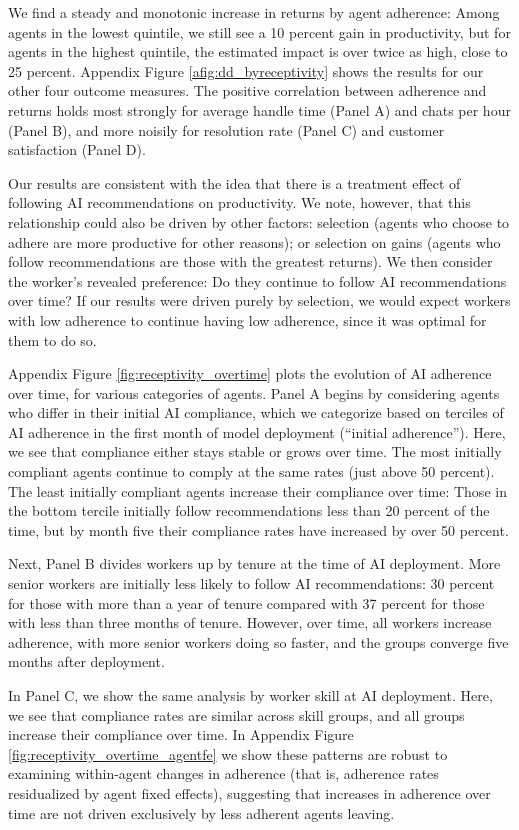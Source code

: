 \documentclass[11pt]{article}
\begin{document}
We find a steady and monotonic increase in returns by agent adherence: Among agents in the lowest quintile, we still see a 10 percent gain in productivity, but for agents in the highest quintile, the estimated impact is over twice as high, close to 25 percent.  Appendix Figure \ref{afig:dd_byreceptivity} shows the results for our other four outcome measures. The positive correlation between adherence and returns holds most strongly for average handle time (Panel A) and chats per hour (Panel B), and more noisily for resolution rate (Panel C) and customer satisfaction (Panel D). 

Our results are consistent with the idea that there is a treatment effect of following AI recommendations on productivity.  We note, however, that this relationship could also be driven by other factors: selection (agents who choose to adhere are more productive for other reasons); or selection on gains (agents who follow recommendations are those with the greatest returns).  We then consider the worker's revealed preference: Do they continue to follow AI recommendations over time?  If our results were driven purely by selection, we would expect workers with low adherence to continue having low adherence, since it was optimal for them to do so.

Appendix Figure \ref{fig:receptivity_overtime} plots the evolution of AI adherence over time, for various categories of agents.  Panel A begins by considering agents who differ in their initial AI compliance, which we categorize based on terciles of AI adherence in the first month of model deployment (``initial adherence'').  Here, we see that compliance either stays stable or grows over time.  The most initially compliant agents continue to comply at the same rates (just above 50 percent).  The least initially compliant agents increase their compliance over time: Those in the bottom tercile initially follow recommendations less than 20 percent of the time, but by month five their compliance rates have increased by over 50 percent.  

Next, Panel B divides workers up by tenure at the time of AI deployment.  More senior workers are initially less likely to follow AI recommendations: 30 percent for those with more than a year of tenure compared with 37 percent for those with less than three months of tenure.  However, over time, all workers increase adherence, with more senior workers doing so faster, and the groups converge five months after deployment.  

In Panel C, we show the same analysis by worker skill at AI deployment.  Here, we see that compliance rates are similar across skill groups, and all groups increase their compliance over time.  In Appendix Figure \ref{fig:receptivity_overtime_agentfe} we show these patterns are robust to examining within-agent changes in adherence (that is, adherence rates residualized by agent fixed effects), suggesting that increases in adherence over time are not driven exclusively by less adherent agents leaving.     
\end{document}
